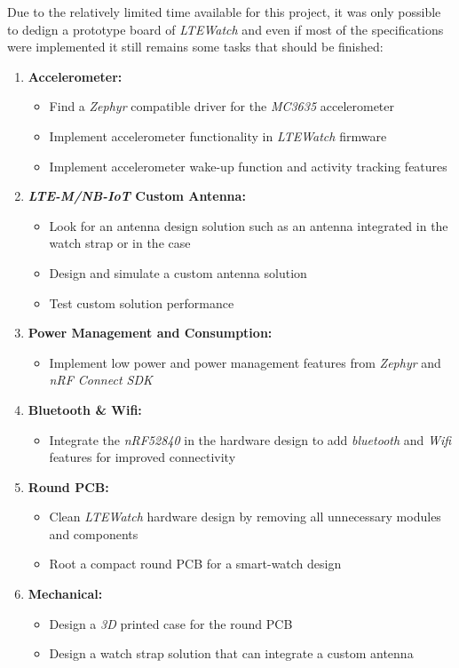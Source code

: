\documentclass[Report.tex]{subfiles}
\begin{document}
Due to the relatively limited time available for this project, it was only possible to dedign a prototype board of \textit{LTEWatch} and even if most of the specifications were implemented it still remains some tasks that should be finished:
\begin{enumerate}
\item \textbf{Accelerometer:}
\begin{itemize}
\item Find a \textit{Zephyr} compatible driver for the \textit{MC3635} accelerometer
\item Implement accelerometer functionality in \textit{LTEWatch} firmware
\item Implement accelerometer wake-up function and activity tracking features
\end{itemize}
\item \textbf{\textit{LTE-M/NB-IoT} Custom Antenna:}
\begin{itemize}
\item Look for an antenna design solution such as an antenna integrated in the watch strap or in the case
\item Design and simulate a custom antenna solution
\item Test custom solution performance
\end{itemize}
\item \textbf{Power Management and Consumption:}
\begin{itemize}
\item Implement low power and power management features from \textit{Zephyr} and \textit{nRF Connect SDK}
\end{itemize}
\item \textbf{Bluetooth \& Wifi:}
\begin{itemize}
\item Integrate the \textit{nRF52840} in the hardware design to add \textit{bluetooth} and \textit{Wifi} features for improved connectivity
\end{itemize}
\item \textbf{Round PCB:}
\begin{itemize}
\item Clean \textit{LTEWatch} hardware design by removing all unnecessary modules and components
\item Root a compact round PCB for a smart-watch design
\end{itemize}
\item \textbf{Mechanical:}
\begin{itemize}
\item Design a \textit{3D} printed case for the round PCB
\item Design a watch strap solution that can integrate a custom antenna
\end{itemize}
\end{enumerate} 
\end{document}
